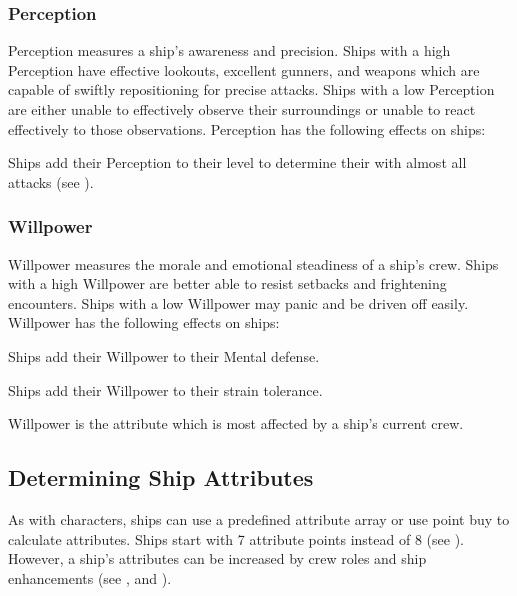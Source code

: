         \subsubsection{Perception}
            Perception measures a ship's awareness and precision.
            Ships with a high Perception have effective lookouts, excellent gunners, and weapons which are capable of swiftly repositioning for precise attacks.
            Ships with a low Perception are either unable to effectively observe their surroundings or unable to react effectively to those observations.
            Perception has the following effects on ships:
            \begin{raggeditemize}
                \item Ships add their Perception to their level to determine their  with almost all attacks (see ).
            \end{raggeditemize}

        \subsubsection{Willpower}
            Willpower measures the morale and emotional steadiness of a ship's crew.
            Ships with a high Willpower are better able to resist setbacks and frightening encounters.
            Ships with a low Willpower may panic and be driven off easily.
            Willpower has the following effects on ships:
            \begin{raggeditemize}
                \item Ships add their Willpower to their Mental defense.
                \item Ships add their Willpower to their strain tolerance.
            \end{raggeditemize}

            Willpower is the attribute which is most affected by a ship's current crew.

    \subsection{Determining Ship Attributes}
        As with characters, ships can use a predefined attribute array or use point buy to calculate attributes.
        Ships start with 7 attribute points instead of 8 (see ).
        However, a ship's attributes can be increased by crew roles and ship enhancements (see , and ).

